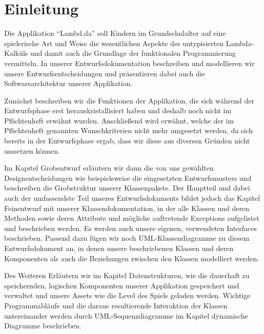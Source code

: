 \section{Einleitung}

Die Applikation "`Lambd.da"' soll Kindern im Grundschulalter auf eine spielerische Art und Weise die wesentlichen Aspekte des untypisierten Lambda-Kalküls und damit auch die Grundlage der funktionalen Programmierung vermitteln. In unserer Entwurfsdokumentation beschreiben und modellieren wir unsere Entwurfsentscheidungen und präsentieren dabei auch die Softwarearchitektur unserer Applikation.

Zunächst beschreiben wir die Funktionen der Applikation, die sich während der Entwurfsphase erst herauskristallisiert haben und deshalb noch nicht im Pflichtenheft erwähnt wurden. Anschließend wird erwähnt, welche der im Pflichtenheft genannten Wunschkriterien nicht mehr umgesetzt werden, da sich bereits in der Entwurfsphase ergab, dass wir diese aus diversen Gründen nicht umsetzen können.

Im Kapitel Grobentwurf erläutern wir dann die von uns gewählten Designentscheidungen wie beispielsweise die eingesetzten Entwurfsmusters und beschreiben die Grobstruktur unserer Klassenpakete. Der Hauptteil und dabei auch der umfassendste Teil unseres Entwurfsdokuments bildet jedoch das Kapitel Feinentwurf mit unserer Klassendokumentation, in der alle Klassen und deren Methoden sowie deren Attribute und mögliche auftretende Exceptions aufgelistet und beschrieben werden. Es werden auch unsere eigenen, verwendeten Interfaces beschrieben. Passend dazu fügen wir noch UML-Klassendiagramme zu diesem Entwurfsdokument an, in denen unsere beschriebenen Klassen und deren Komponenten als auch die Beziehungen zwischen den Klassen modelliert werden.

Des Weiteren Erläutern wir im Kapitel Datenstrukturen, wie die dauerhaft zu speichernden, logischen Komponenten unserer Applikation gespeichert und verwaltet und unsere Assets wie die Level des Spiels geladen werden. Wichtige Programmabläufe und die daraus resultierende Interaktion der Klassen untereinander werden durch UML-Sequenzdiagramme im Kapitel dynamische Diagramme beschrieben.